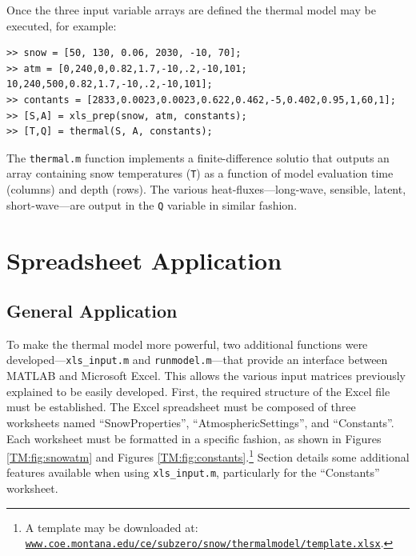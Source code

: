 Once the three input variable arrays are defined the thermal model may be executed, for example:
\begin{singlespaced}\begin{lstlisting}[style=inline]
>> snow = [50, 130, 0.06, 2030, -10, 70];
>> atm = [0,240,0,0.82,1.7,-10,.2,-10,101; 10,240,500,0.82,1.7,-10,.2,-10,101];
>> contants = [2833,0.0023,0.0023,0.622,0.462,-5,0.402,0.95,1,60,1];
>> [S,A] = xls_prep(snow, atm, constants);
>> [T,Q] = thermal(S, A, constants); 
\end{lstlisting}\end{singlespaced}

The \texttt{thermal.m} function implements a finite-difference solutio  that outputs an array containing snow temperatures (\texttt{T}) as a function of model evaluation time (columns) and depth (rows).  The various heat-fluxes---long-wave, sensible, latent, short-wave---are output in the \texttt{Q} variable in similar fashion.

\section{Spreadsheet Application}\label{TM:sec:spread}
\subsection{General Application}
To make the thermal model more powerful, two additional functions were developed---\texttt{xls\_input.m} and \texttt{runmodel.m}---that provide an interface between MATLAB and Microsoft Excel. This allows the various input matrices previously explained to be easily developed. First, the required structure of the Excel file must be established.  The Excel spreadsheet must be composed of three worksheets named ``SnowProperties'', ``AtmosphericSettings'', and ``Constants''.  Each worksheet must be formatted in a specific fashion, as shown in Figures \ref{TM:fig:snowatm} and Figures \ref{TM:fig:constants}.\footnote{A template may be downloaded at: \href{http://www.coe.montana.edu/ce/subzero/snow/thermalmodel/template.xlsx}{\nolinkurl{www.coe.montana.edu/ce/subzero/snow/thermalmodel/template.xlsx}}.}  Section  details some additional features available when using \texttt{xls\_input.m}, particularly for the ``Constants'' worksheet.  

